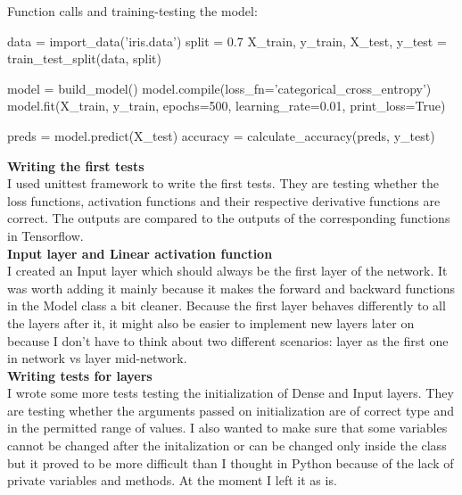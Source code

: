 \documentclass{article}
\begin{document}
Function calls and training-testing the model:
\begin{python}
data = import_data('iris.data')
split = 0.7
X_train, y_train, X_test, y_test = train_test_split(data, split)

model = build_model()
model.compile(loss_fn='categorical_cross_entropy')
model.fit(X_train,
          y_train,
          epochs=500,
          learning_rate=0.01,
          print_loss=True)

preds = model.predict(X_test)
accuracy = calculate_accuracy(preds, y_test)
\end{python}

\textbf{Writing the first tests} \\

I used unittest framework to write the first tests. They are testing whether 
the loss functions, activation functions and their respective derivative functions 
are correct. The outputs are compared to the outputs of the corresponding functions 
in Tensorflow. \\

\textbf{Input layer and Linear activation function} \\

I created an Input layer which should always be the first layer of the network. It was 
worth adding it mainly because it makes the forward and backward functions in the Model 
class a bit cleaner. Because the first layer behaves differently to all the layers after it, 
it might also be easier to implement new layers later on because I don't have to think about 
two different scenarios: layer as the first one in network vs layer mid-network. \\

\textbf{Writing tests for layers} \\

I wrote some more tests testing the initialization of Dense and Input layers. They are testing 
whether the arguments passed on initialization are of correct type and in the permitted 
range of values. I also wanted to make sure that some variables cannot be changed after the 
initalization or can be changed only inside the class but it proved to be more difficult than 
I thought in Python because of the lack of private variables and methods. At the moment I left 
it as is.\\ 
\end{document}

